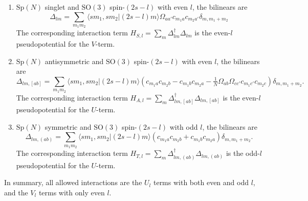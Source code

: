\documentclass{timesjhep}
\begin{document}
\begin{enumerate}
    \item $\mathrm{Sp}(N)$ singlet and $\mathrm{SO}(3)$ spin-$(2s-l)$ with even $l$, the bilinears are 
    \begin{equation}
        \Delta_{lm}=\sum_{m_1m_2}\langle sm_1,sm_2|(2s-l)m\rangle\Omega_{aa'}c_{m_1a}c_{m_2a'}\delta_{m,m_1+m_2} 
    \end{equation} 
    The corresponding interaction term $H_{S,l}=\sum_m\Delta_{lm}^\dagger\Delta_{lm}$ is the even-$l$ pseudopotential for the $V$-term. 
    \item $\mathrm{Sp}(N)$ antisymmetric and $\mathrm{SO}(3)$ spin-$(2s-l)$ with even $l$, the bilinears are 
    \begin{equation}
        \Delta_{lm,[ab]}=\sum_{m_1m_2}\langle sm_1,sm_2|(2s-l)m\rangle\left(c_{m_1a}c_{m_2b}-c_{m_1b}c_{m_2a}-\tfrac{1}{N}\Omega_{ab}\Omega_{cc'}c_{m_1c'}c_{m_2c}\right)\delta_{m,m_1+m_2}.
    \end{equation} 
    The corresponding interaction term $H_{A,l}=\sum_m\Delta_{lm,[ab]}^\dagger\Delta_{lm,[ab]}$ is the even-$l$ pseudopotential for the $U$-term. 
    \item $\mathrm{Sp}(N)$ symmetric and $\mathrm{SO}(3)$ spin-$(2s-l)$ with odd $l$, the bilinears are 
    \begin{equation}
        \Delta_{lm,(ab)}=\sum_{m_1m_2}\langle sm_1,sm_2|(2s-l)m\rangle\left(c_{m_1a}c_{m_2b}+c_{m_1b}c_{m_2a}\right)\delta_{m,m_1+m_2}.
    \end{equation} 
    The corresponding interaction term $H_{T,l}=\sum_m\Delta_{lm,(ab)}^\dagger\Delta_{lm,(ab)}$ is the odd-$l$ pseudopotential for the $U$-term. 
\end{enumerate}

In summary, all allowed interactions are the $U_l$ terms with both even and odd $l$, and the $V_l$ terms with only even $l$. 
\end{document}
